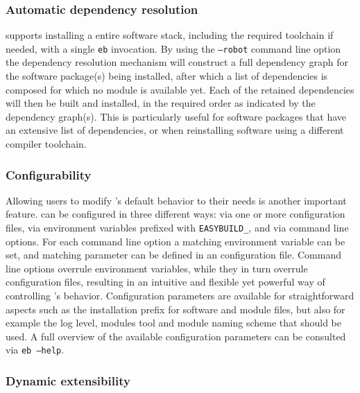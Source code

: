 \subsubsection{Automatic dependency resolution}
\label{sec:eb_dependency_resolution}

\easybuild{} supports installing a entire software stack, including the required
toolchain if needed, with a single \texttt{eb} invocation. By using the
\texttt{--robot} command line option the dependency resolution mechanism will
construct a full dependency graph for the software package(s) being installed, after
which a list of dependencies is composed for which no module is available yet. Each of
the retained dependencies will then be built and installed, in the required order as
indicated by the dependency graph(s). This is particularly useful for software
packages that have an extensive list of dependencies, or when reinstalling software
using a different compiler toolchain.

\subsubsection{Configurability}
\label{sec:eb_configurability}

Allowing users to modify \easybuild{}'s default behavior to their needs is another
important feature. \easybuild{} can be configured in three different ways: via one or
more configuration files, via environment variables prefixed with
\texttt{EASYBUILD\_}, and via command line options. For each command line option a
matching environment variable can be set, and matching parameter can be defined in an
configuration file. Command line options overrule environment variables, while they
in turn overrule configuration files, resulting in an intuitive and flexible yet
powerful way of controlling \easybuild{}'s behavior. Configuration parameters
are available for straightforward aspects such as the installation prefix for
software and module files, but also for example the log level, modules tool and
module naming scheme that should be used. A full overview of the available
configuration parameters can be consulted via \texttt{eb --help}.

\subsubsection{Dynamic extensibility}
\label{sec:eb_extensible}

